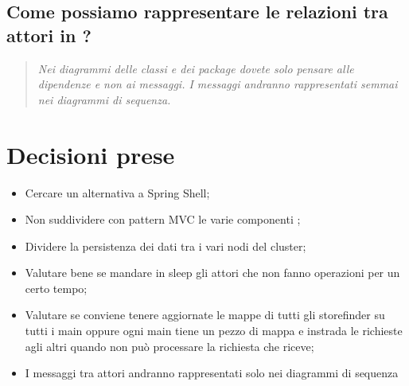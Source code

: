 \documentclass{scalatekids-article}
\begin{document}
\subsection{Come possiamo rappresentare le relazioni tra attori in ?\\}
\begin{quote}
  \textit{Nei diagrammi delle classi e dei package dovete solo pensare alle dipendenze e non ai messaggi. I messaggi andranno rappresentati semmai nei diagrammi di sequenza.}
\end{quote}


\section{Decisioni prese}
\begin{itemize}
  \item Cercare un alternativa a Spring Shell;
  \item Non suddividere con pattern MVC le varie componenti ;
  \item Dividere la persistenza dei dati tra i vari nodi del cluster;
  \item Valutare bene se mandare in sleep gli attori che non fanno operazioni per un certo tempo;
  \item Valutare se conviene tenere aggiornate le mappe di tutti gli storefinder su tutti i main oppure ogni main tiene un pezzo di mappa e instrada le richieste agli altri quando non può processare la richiesta che riceve;
  \item I messaggi tra attori andranno rappresentati solo nei diagrammi di sequenza
\end{itemize}
\end{document}
